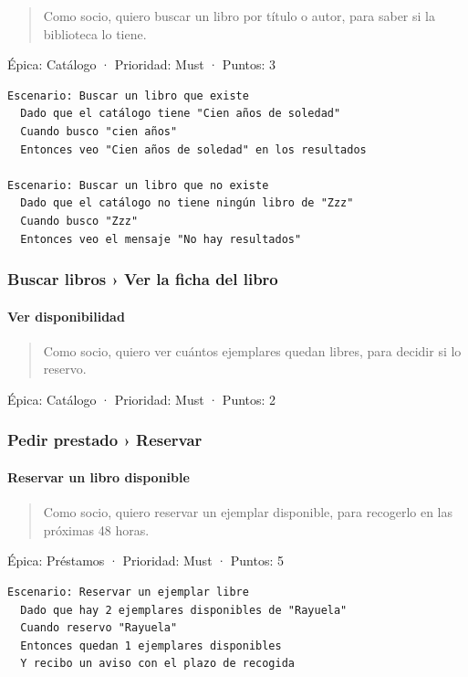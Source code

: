 \documentclass[11pt,a4paper]{article}
\begin{document}
\begin{quote}
Como socio, quiero buscar un libro por título o autor, para saber si la biblioteca lo tiene.
\end{quote}

Épica: Catálogo · Prioridad: Must · Puntos: 3

\begin{Verbatim}[breaklines,fontsize=\small,frame=single,framerule=0.4pt,rulecolor=\color{black!25}]
Escenario: Buscar un libro que existe
  Dado que el catálogo tiene "Cien años de soledad"
  Cuando busco "cien años"
  Entonces veo "Cien años de soledad" en los resultados

Escenario: Buscar un libro que no existe
  Dado que el catálogo no tiene ningún libro de "Zzz"
  Cuando busco "Zzz"
  Entonces veo el mensaje "No hay resultados"
\end{Verbatim}

\subsubsection*{Buscar libros › Ver la ficha del libro}

\paragraph*{Ver disponibilidad}

\begin{quote}
Como socio, quiero ver cuántos ejemplares quedan libres, para decidir si lo reservo.
\end{quote}

Épica: Catálogo · Prioridad: Must · Puntos: 2

\subsubsection*{Pedir prestado › Reservar}

\paragraph*{Reservar un libro disponible}

\begin{quote}
Como socio, quiero reservar un ejemplar disponible, para recogerlo en las próximas 48 horas.
\end{quote}

Épica: Préstamos · Prioridad: Must · Puntos: 5

\begin{Verbatim}[breaklines,fontsize=\small,frame=single,framerule=0.4pt,rulecolor=\color{black!25}]
Escenario: Reservar un ejemplar libre
  Dado que hay 2 ejemplares disponibles de "Rayuela"
  Cuando reservo "Rayuela"
  Entonces quedan 1 ejemplares disponibles
  Y recibo un aviso con el plazo de recogida
\end{Verbatim}
\end{document}

